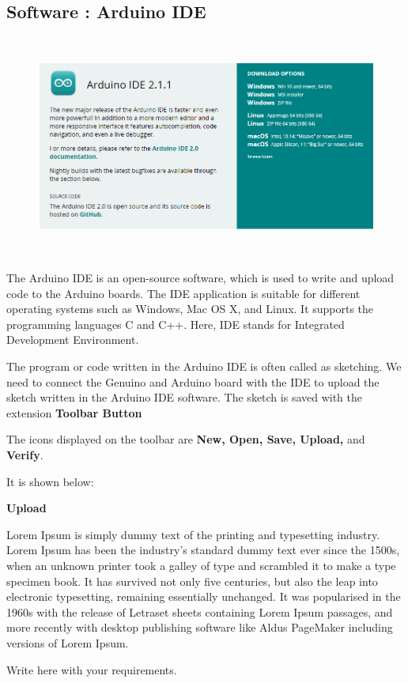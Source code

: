 \subsection{Software : \textbf{Arduino IDE}}
\vspace{1\baselineskip}
	\begin{figure}[H]
	\includegraphics[width=14.33cm,height=7.31cm]{./images/arduino_ide.png}
	\end{figure}
	
	
	The Arduino IDE is an open-source software, which is used to write and upload code to the Arduino boards. The IDE application is suitable for different operating systems such as Windows, Mac OS X, and Linux. It supports the programming languages C and C++. Here, IDE stands for Integrated Development Environment.
	
	The program or code written in the Arduino IDE is often called as sketching. We need to connect the Genuino and Arduino board with the IDE to upload the sketch written in the Arduino IDE software. The sketch is saved with the extension 
	\break
	\textbf{Toolbar Button}
	
	The icons displayed on the toolbar are \textbf{New, Open, Save, Upload,} and \textbf{Verify}.
	
	It is shown below:
	

	
	
	\textbf{Upload}
	
	Lorem Ipsum is simply dummy text of the printing and typesetting industry. Lorem Ipsum has been the industry's standard dummy text ever since the 1500s, when an unknown printer took a galley of type and scrambled it to make a type specimen book. It has survived not only five centuries, but also the leap into electronic typesetting, remaining essentially unchanged. It was popularised in the 1960s with the release of Letraset sheets containing Lorem Ipsum passages, and more recently with desktop publishing software like Aldus PageMaker including versions of Lorem Ipsum.
	\vspace{3\baselineskip}
    \begin{center}
        \Large Write here with your requirements.
    \end{center}
	\vspace{3\baselineskip}
	

